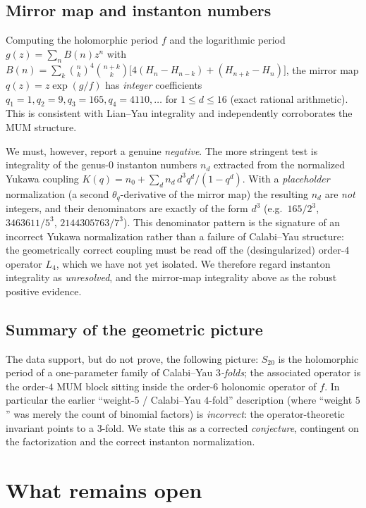 \documentclass[11pt,a4paper]{article}
\theoremstyle{definition}
\theoremstyle{remark}
\newcommand{\Sx}{S_{20}}
\begin{document}
\subsection{Mirror map and instanton numbers}

Computing the holomorphic period $f$ and the logarithmic period
$g(z)=\sum_n B(n)z^n$ with
$B(n)=\sum_k\binom nk^4\binom{n+k}k\big[4(H_n-H_{n-k})+(H_{n+k}-H_n)\big]$,
the mirror map $q(z)=z\exp(g/f)$ has \emph{integer} coefficients
$q_1=1,q_2=9,q_3=165,q_4=4110,\dots$ for $1\le d\le 16$ (exact rational
arithmetic). This is consistent with Lian--Yau integrality and independently
corroborates the MUM structure.

We must, however, report a genuine \emph{negative}. The more stringent test is
integrality of the genus-$0$ instanton numbers $n_d$ extracted from the
normalized Yukawa coupling $K(q)=n_0+\sum_d n_d\,d^3 q^d/(1-q^d)$. With a
\emph{placeholder} normalization (a second $\theta_q$-derivative of the mirror
map) the resulting $n_d$ are \emph{not} integers, and their denominators are
exactly of the form $d^3$ (e.g.\ $165/2^3$, $3463611/5^3$, $2144305763/7^3$).
This denominator pattern is the signature of an incorrect Yukawa normalization
rather than a failure of Calabi--Yau structure: the geometrically correct
coupling must be read off the (desingularized) order-$4$ operator $L_4$, which we
have not yet isolated. We therefore regard instanton integrality as
\emph{unresolved}, and the mirror-map integrality above as the robust positive
evidence.

\subsection{Summary of the geometric picture}

The data support, but do not prove, the following picture: $\Sx$ is the
holomorphic period of a one-parameter family of Calabi--Yau \emph{$3$-folds};
the associated operator is the order-$4$ MUM block sitting inside the order-$6$
holonomic operator of $f$. In particular the earlier ``weight-$5$ / Calabi--Yau
$4$-fold'' description (where ``weight $5$'' was merely the count of binomial
factors) is \emph{incorrect}: the operator-theoretic invariant points to a
$3$-fold. We state this as a corrected \emph{conjecture}, contingent on the
factorization and the correct instanton normalization.

\section{What remains open}\label{sec:open}
\end{document}

